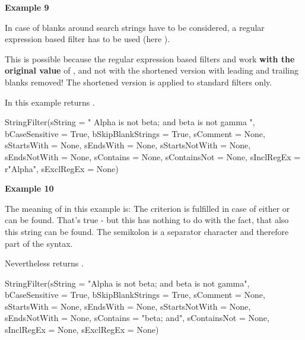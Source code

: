 \textbf{Example 9}

In case of blanks around search strings have to be considered, a regular expression based filter has to be used (here ).

This is possible because the regular expression based filters  and  work \textbf{with the original value}
of , and not with the shortened version with leading and trailing blanks removed!
The shortened version is applied to standard filters only.

In this example  returns .

\begin{pythoncode}
StringFilter(sString           = "   Alpha is not beta; and beta is not gamma  ",
             bCaseSensitive    = True,
             bSkipBlankStrings = True,
             sComment          = None,
             sStartsWith       = None,
             sEndsWith         = None,
             sStartsNotWith    = None,
             sEndsNotWith      = None,
             sContains         = None,
             sContainsNot      = None,
             sInclRegEx        = r"Alpha",
             sExclRegEx        = None)
\end{pythoncode}

\newpage

\textbf{Example 10}

The meaning of  in this example is: The criterion is fulfilled in case of either  or  can be found.
That's true - but this has nothing to do with the fact, that also this string  can be found. The semikolon is a separator
character and therefore part of the syntax.

Nevertheless  returns .

\begin{pythoncode}
StringFilter(sString           = "Alpha is not beta; and beta is not gamma",
             bCaseSensitive    = True,
             bSkipBlankStrings = True,
             sComment          = None,
             sStartsWith       = None,
             sEndsWith         = None,
             sStartsNotWith    = None,
             sEndsNotWith      = None,
             sContains         = "beta; and",
             sContainsNot      = None,
             sInclRegEx        = None,
             sExclRegEx        = None)
\end{pythoncode}

